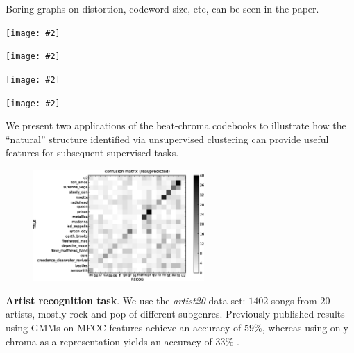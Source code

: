 \documentclass[portrait,a0b,final]{a0poster}
\newenvironment{poster}{
  \begin{center}
  \begin{minipage}[c]{0.98\textwidth}
}{
  \end{minipage} 
  \end{center}
}
\newcommand{\pbox}[4]{
\psshadowbox[#3]{
\begin{minipage}[t][#2][t]{#1}
#4
\end{minipage}
}}
\newcommand{\myfig}[3][0]{
\begin{center}
  \vspace{1.5cm}
  \texttt{[image: \#2]}
  \nobreak\medskip
\end{center}}
\begin{document}
\begin{poster}
\begin{multicols}{3}
\vspace{1.0cm}

Boring graphs on distortion, codeword size, etc, can be seen in the paper.

\myfig[0]{codes1.ps}{.8}

\myfig[0]{close_patterns1.ps}{.8}

\myfig[0]{close_patterns_diff.ps}{.8}

\myfig[0]{codes_lle.ps}{.8}

\newpage


\vspace{2cm}
\begin{center}
  \pbox{0.8\columnwidth}{}{linewidth=2mm,framearc=0.1,linecolor=lightred,fillstyle=gradient,gradangle=0,gradbegin=white,gradend=whitepink,gradmidpoint=1.0,framesep=1em}{
    \begin{center}
      \large Experiments
    \end{center}}
\end{center}

\vspace{1.0cm}

\begin{minipage}[c]{\columnwidth}

We present two applications of the beat-chroma codebooks
to illustrate how the ``natural'' structure identified via 
unsupervised clustering can provide useful 
features for subsequent supervised tasks.
\vspace{1cm}

\begin{figure}
  \vspace{-20pt}
  \begin{center}
    \includegraphics[width=0.58\textwidth]{conf_mat_per_artist.ps}
  \end{center}
  \vspace{-20pt}
\end{figure}

\textbf{Artist recognition task}.
We use the {\it artist20} data set: $1402$ songs from $20$ artists, 
mostly rock and pop of different subgenres.  
Previously published results using GMMs on MFCC features achieve an 
accuracy of $59\%$, whereas using only chroma as a representation yields an
accuracy of $33\%$  \cite{Ellis2007}.


\end{minipage}
\end{multicols}
\end{poster}
\end{document}

